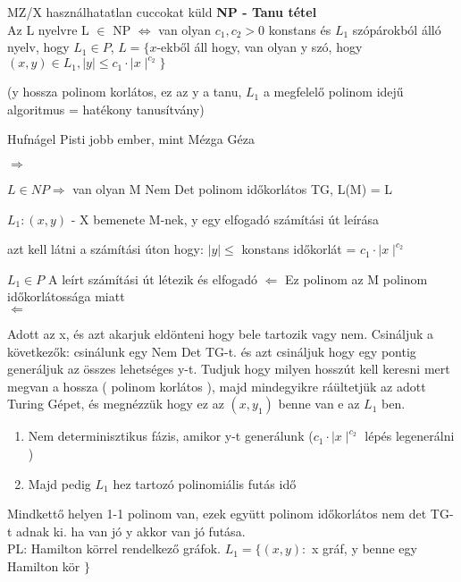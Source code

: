 	 \begin{tetel}{MZ/X használhatatlan cuccokat küld}
   \textbf{NP - Tanu tétel} \\[3pt]
	 Az L nyelvre L $\in$ NP $\Leftrightarrow$ van olyan $c_1,c_2 > 0$ konstans és $L_1$ szópárokból álló nyelv, hogy $L_1 \in P$, $L = \lbrace x$-ekből áll hogy, van olyan y szó, hogy $(x,y) \in L_1, \mid y \mid \leq c_1\cdot \mid x \mid^{c_2} \rbrace $

	 (y hossza polinom korlátos, ez az y a tanu, $L_1$ a megfelelő polinom idejű algoritmus = hatékony tanusítvány) \\[4pt]
\end{tetel}

\begin{bizonyitas}{Hufnágel Pisti jobb ember, mint Mézga Géza}

	 $\Rightarrow$

	 $L \in NP \Rightarrow$ van olyan M Nem Det polinom időkorlátos TG, L(M) = L

	 $L_1 : (x,y)$ - X bemenete M-nek, y egy elfogadó számítási út leírása

	 azt kell látni a számítási úton hogy: $\mid y \mid \leq$ konstans időkorlát = $c_1\cdot \mid x \mid^{c_2}$

	 $L_1 \in P$ A leírt számítási út létezik és elfogadó $\Leftarrow$ Ez polinom az M polinom időkorlátossága miatt\\[-3pt]

	 $\Leftarrow$

	 Adott az x, és azt akarjuk eldönteni hogy bele tartozik vagy nem. Csináljuk a következők: csinálunk egy Nem Det TG-t. és azt csináljuk hogy egy pontig generáljuk az összes lehetséges y-t. Tudjuk hogy milyen hosszút kell keresni mert megvan a hossza ( polinom korlátos ), majd mindegyikre ráültetjük az adott Turing Gépet, és megnézzük hogy ez az $(x,y_1)$ benne van e az $L_1$ ben.

	\begin{enumerate}[itemsep=1mm]
		\item Nem determinisztikus fázis, amikor y-t generálunk ($c_1\cdot \mid x \mid^{c_2}$  lépés legenerálni )
		\item Majd pedig $L_1$ hez tartozó polinomiális futás idő
	\end{enumerate}

	Mindkettő helyen 1-1 polinom van, ezek együtt polinom időkorlátos nem det TG-t adnak ki. ha van jó y akkor van jó futása.\\[-2pt]

	 PL: Hamilton körrel rendelkező gráfok. $L_1 = \lbrace (x,y):$ x gráf, y benne egy Hamilton kör $\rbrace$\\[0pt]
\end{bizonyitas}

